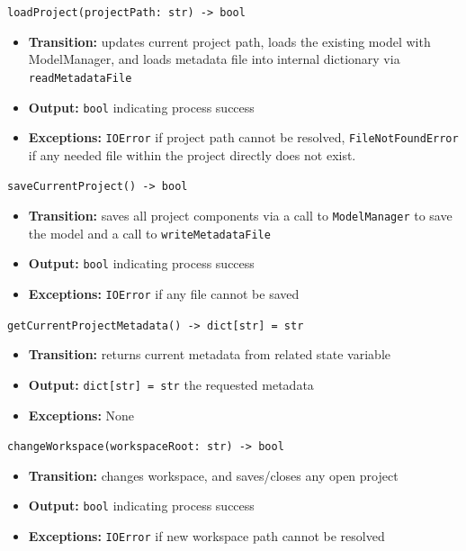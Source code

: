 \documentclass[12pt, titlepage]{article}
\begin{document}
\texttt{loadProject(projectPath: str) -> bool}
\begin{itemize}
  \item \textbf{Transition:} updates current project path, loads the existing model with ModelManager, and loads metadata file into internal dictionary via \texttt{readMetadataFile}
  \item \textbf{Output:} \texttt{bool} indicating process success
  \item \textbf{Exceptions:} \texttt{IOError} if project path cannot be resolved, \texttt{FileNotFoundError} if any needed file within the project directly does not exist.
\end{itemize}
\texttt{saveCurrentProject() -> bool}
\begin{itemize}
  \item \textbf{Transition:} saves all project components via a call to \texttt{ModelManager} to save the model and a call to \texttt{writeMetadataFile}
  \item \textbf{Output:} \texttt{bool} indicating process success
  \item \textbf{Exceptions:} \texttt{IOError} if any file cannot be saved
\end{itemize}
\texttt{getCurrentProjectMetadata() -> dict[str] = str}
\begin{itemize}
  \item \textbf{Transition:} returns current metadata from related state variable
  \item \textbf{Output:} \texttt{dict[str] = str} the requested metadata
  \item \textbf{Exceptions:} None
\end{itemize}
\texttt{changeWorkspace(workspaceRoot: str) -> bool}
\begin{itemize}
  \item \textbf{Transition:} changes workspace, and saves/closes any open project
  \item \textbf{Output:} \texttt{bool} indicating process success
  \item \textbf{Exceptions:} \texttt{IOError} if new workspace path cannot be resolved
\end{itemize}
\end{document}
